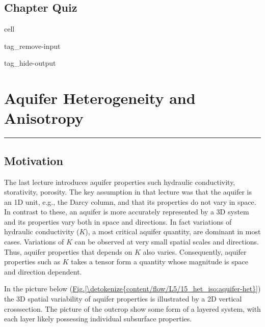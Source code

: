 \documentclass[letterpaper,10pt,english]{jupyterBook}
\begin{document}
\section{Chapter Quiz}
\label{\detokenize{content/flow/L4/14_darcy_law_K:chapter-quiz}}
\begin{sphinxuseclass}{cell}
\begin{sphinxuseclass}{tag_remove-input}
\begin{sphinxuseclass}{tag_hide-output}
\end{sphinxuseclass}
\end{sphinxuseclass}
\end{sphinxuseclass}
\sphinxstepscope


\chapter{Aquifer Heterogeneity and Anisotropy}
\label{\detokenize{content/flow/L5/15_het_iso:aquifer-heterogeneity-and-anisotropy}}\label{\detokenize{content/flow/L5/15_het_iso::doc}}
\sphinxAtStartPar
{}


\bigskip\hrule\bigskip



\section{Motivation}
\label{\detokenize{content/flow/L5/15_het_iso:motivation}}
\sphinxAtStartPar
The last lecture introduces aquifer properties such hydraulic conductivity, storativity, porosity. The key assumption in that lecture was that the aquifer is an 1D unit, e.g., the Darcy column, and that its properties do not vary in space. In contrast to these, an aquifer is more accurately represented by a 3D system and its properties vary both in space and directions. In fact variations of hydraulic conductivity (\(K\)), a most critical aquifer quantity, are dominant in most cases. Variations of \(K\) can be observed at very small spatial scales and directions. Thus, aquifer properties that depends on \(K\) also varies. Consequently, aquifer properties such as \(K\) takes a tensor form\sphinxhyphen{} a quantity whose magnitude is space and direction dependent.

\sphinxAtStartPar
In the picture below (\hyperref[\detokenize{content/flow/L5/15_het_iso:aquifer-het}]{Fig.\@ \ref{\detokenize{content/flow/L5/15_het_iso:aquifer-het}}}) the 3\sphinxhyphen{}D spatial variability of aquifer properties is illustrated by a 2\sphinxhyphen{}D vertical cross\sphinxhyphen{}section. The picture of the outcrop show some form of a layered system, with each layer likely possessing individual subsurface properties.
\end{document}
